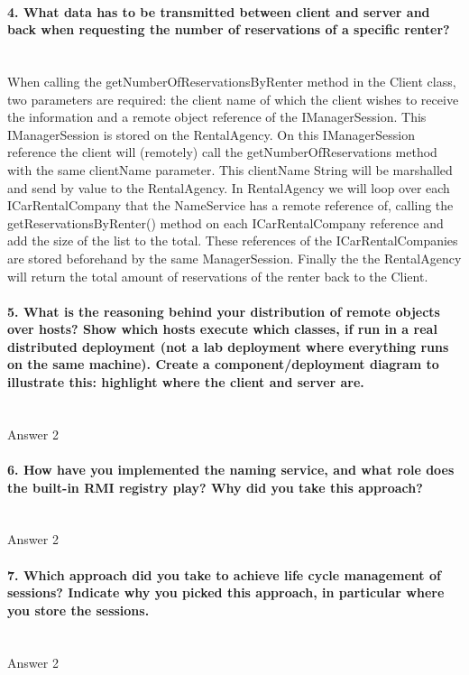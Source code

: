 \documentclass{ds-report}
\begin{document}
	\paragraph{4. What data has to be transmitted between client and server and back when requesting the number of reservations of a specific renter?} \mbox{}\\
When calling the getNumberOfReservationsByRenter method in the Client class, two parameters are required: the client name of which the client wishes to receive the information and a remote object reference of the IManagerSession. This IManagerSession is stored on the RentalAgency. On this IManagerSession reference the client will (remotely) call the getNumberOfReservations method with the same clientName parameter. This clientName String will be marshalled and send by value to the RentalAgency. 
In RentalAgency we will loop over each ICarRentalCompany that the NameService has a remote reference of, calling the getReservationsByRenter() method on each ICarRentalCompany reference and add the size of the list to the total. These references of the ICarRentalCompanies are stored beforehand by the same ManagerSession. 
Finally the the RentalAgency will return the total amount of reservations of the renter back to the Client.

	\paragraph{5. What is the reasoning behind your distribution of remote objects over hosts? Show which
hosts execute which classes, if run in a real distributed deployment (not a lab deployment where
everything runs on the same machine). Create a component/deployment diagram to illustrate this:
highlight where the client and server are.} \mbox{}\\
	Answer 2

	\paragraph{6. How have you implemented the naming service, and what role does the built-in RMI registry play?
Why did you take this approach?} \mbox{}\\
	Answer 2

	\paragraph{7. Which approach did you take to achieve life cycle management of sessions? Indicate why you
picked this approach, in particular where you store the sessions.} \mbox{}\\
	Answer 2
\end{document}
